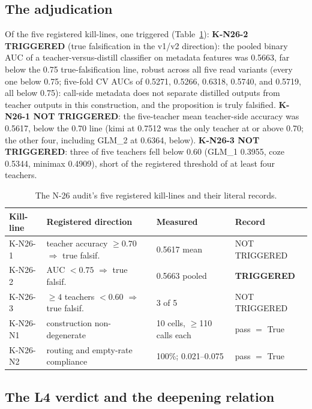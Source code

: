 \documentclass[11pt]{article}
\begin{document}
\subsection{The adjudication}

Of the five registered kill-lines, one triggered (Table~\ref{tab:n26}): \textbf{K-N26-2 TRIGGERED} (true falsification in the v1/v2 direction): the pooled binary AUC of a teacher-versus-distill classifier on metadata features was 0.5663, far below the 0.75 true-falsification line, robust across all five read variants (every one below 0.75; five-fold CV AUCs of 0.5271, 0.5266, 0.6318, 0.5740, and 0.5719, all below 0.75): call-side metadata does not separate distilled outputs from teacher outputs in this construction, and the proposition is truly falsified. \textbf{K-N26-1 NOT TRIGGERED}: the five-teacher mean teacher-side accuracy was 0.5617, below the 0.70 line (kimi at 0.7512 was the only teacher at or above 0.70; the other four, including GLM\_2 at 0.6364, below). \textbf{K-N26-3 NOT TRIGGERED}: three of five teachers fell below 0.60 (GLM\_1 0.3955, coze 0.5344, minimax 0.4909), short of the registered threshold of at least four teachers.

\begin{table}[htbp]
\centering
\begin{tabular}{llll}
\toprule
Kill-line & Registered direction & Measured & Record \\
\midrule
K-N26-1 & teacher accuracy $\geq 0.70$ $\Rightarrow$ true falsif. & 0.5617 mean & NOT TRIGGERED \\
K-N26-2 & AUC $< 0.75$ $\Rightarrow$ true falsif. & 0.5663 pooled & \textbf{TRIGGERED} \\
K-N26-3 & $\geq 4$ teachers $< 0.60$ $\Rightarrow$ true falsif. & 3 of 5 & NOT TRIGGERED \\
K-N26-N1 & construction non-degenerate & 10 cells, $\geq$110 calls each & pass $=$ True \\
K-N26-N2 & routing and empty-rate compliance & 100\%; 0.021--0.075 & pass $=$ True \\
\bottomrule
\end{tabular}
\caption{The N-26 audit's five registered kill-lines and their literal records.}
\label{tab:n26}
\end{table}

\subsection{The L4 verdict and the deepening relation}
\end{document}
